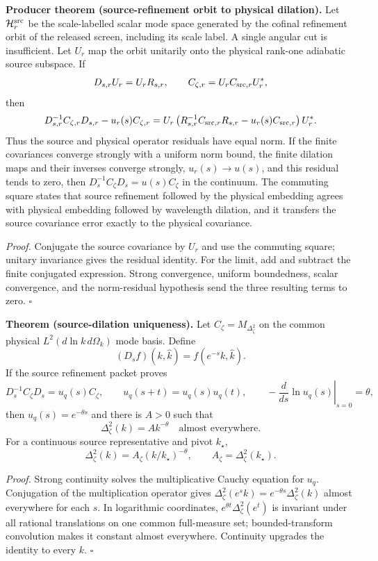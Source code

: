 \textbf{Producer theorem (source-refinement orbit to physical dilation).}
\label{thm:oph330-source-orbit-transfer}
Let $\mathcal H^{\rm src}_r$ be the scale-labelled scalar mode space generated by
the cofinal refinement orbit of the released screen, including its scale label.
A single angular cut is insufficient. Let $U_r$ map the orbit unitarily onto the physical rank-one adiabatic source
subspace.  If
\[
 D_{s,r}U_r=U_rR_{s,r},\qquad
 C_{\zeta,r}=U_rC_{{\rm src},r}U_r^*,
\]
then
\[
 D_{s,r}^{-1}C_{\zeta,r}D_{s,r}-u_r(s)C_{\zeta,r}
 =U_r\left(R_{s,r}^{-1}C_{{\rm src},r}R_{s,r}
           -u_r(s)C_{{\rm src},r}\right)U_r^*.
\]
Thus the source and physical operator residuals have equal norm.  If the finite
covariances converge strongly with a uniform norm bound, the finite dilation maps
and their inverses converge strongly, $u_r(s)\to u(s)$, and this residual tends to
zero, then $D_s^{-1}C_\zeta D_s=u(s)C_\zeta$ in the continuum.
The commuting square states that source refinement followed by the physical
embedding agrees with physical embedding followed by wavelength dilation, and
it transfers the source covariance error exactly to the physical covariance.

\textit{Proof.}
Conjugate the source covariance by $U_r$ and use the commuting square; unitary
invariance gives the residual identity.  For the limit, add and subtract the
finite conjugated expression.  Strong convergence, uniform boundedness, scalar
convergence, and the norm-residual hypothesis send the three resulting terms to
zero.  \hfill$\square$

\textbf{Theorem (source-dilation uniqueness).}
\label{thm:oph330-source-dilation-uniqueness}
Let $C_\zeta=M_{\Delta_\zeta^2}$ on the common physical
$L^2(d\ln k\,d\Omega_k)$ mode basis.  Define
\[
 (D_sf)(k,\hat k)=f(e^{-s}k,\hat k).
\]
If the source refinement packet proves
\[
 D_s^{-1}C_\zeta D_s=u_q(s)C_\zeta,
 \qquad
 u_q(s+t)=u_q(s)u_q(t),
 \qquad
 -\left.\frac{d}{ds}\ln u_q(s)\right|_{s=0}=\theta,
\]
then $u_q(s)=e^{-\theta s}$ and there is $A>0$ such that
\[
 \Delta_\zeta^2(k)=Ak^{-\theta}\quad\text{almost everywhere}.
\]
For a continuous source representative and pivot $k_\star$,
\[
 \boxed{\Delta_\zeta^2(k)=A_\zeta(k/k_\star)^{-\theta}},
 \qquad A_\zeta=\Delta_\zeta^2(k_\star).
\]

\textit{Proof.}
Strong continuity solves the multiplicative Cauchy equation for $u_q$.
Conjugation of the multiplication operator gives
$\Delta_\zeta^2(e^sk)=e^{-\theta s}\Delta_\zeta^2(k)$ almost everywhere for
each $s$.  In logarithmic coordinates,
$e^{\theta t}\Delta_\zeta^2(e^t)$ is invariant under all rational translations
on one common full-measure set; bounded-transform convolution makes it constant
almost everywhere.  Continuity upgrades the identity to every $k$.  \hfill$\square$


